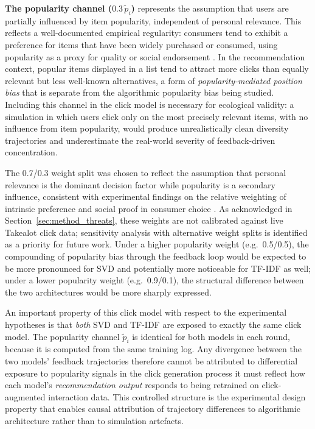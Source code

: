 \documentclass[11pt,a4paper]{report}
\begin{document}
\textbf{The popularity channel ($0.3\, \tilde{p}_i$)} represents the assumption that users are partially influenced by item popularity, independent of personal relevance. This reflects a well-documented empirical regularity: consumers tend to exhibit a preference for items that have been widely purchased or consumed, using popularity as a proxy for quality or social endorsement \citep{cialdini1984influence}. In the recommendation context, popular items displayed in a list tend to attract more clicks than equally relevant but less well-known alternatives, a form of \emph{popularity-mediated position bias} that is separate from the algorithmic popularity bias being studied. Including this channel in the click model is necessary for ecological validity: a simulation in which users click only on the most precisely relevant items, with no influence from item popularity, would produce unrealistically clean diversity trajectories and underestimate the real-world severity of feedback-driven concentration.

The 0.7/0.3 weight split was chosen to reflect the assumption that personal relevance is the dominant decision factor while popularity is a secondary influence, consistent with experimental findings on the relative weighting of intrinsic preference and social proof in consumer choice \citep{cialdini1984influence}. As acknowledged in Section~\ref{sec:method_threats}, these weights are not calibrated against live Takealot click data; sensitivity analysis with alternative weight splits is identified as a priority for future work. Under a higher popularity weight (e.g.\ 0.5/0.5), the compounding of popularity bias through the feedback loop would be expected to be more pronounced for SVD and potentially more noticeable for TF-IDF as well; under a lower popularity weight (e.g.\ 0.9/0.1), the structural difference between the two architectures would be more sharply expressed.

An important property of this click model with respect to the experimental hypotheses is that \emph{both} SVD and TF-IDF are exposed to exactly the same click model. The popularity channel $\tilde{p}_i$ is identical for both models in each round, because it is computed from the same training log. Any divergence between the two models' feedback trajectories therefore cannot be attributed to differential exposure to popularity signals in the click generation process it must reflect how each model's \emph{recommendation output} responds to being retrained on click-augmented interaction data. This controlled structure is the experimental design property that enables causal attribution of trajectory differences to algorithmic architecture rather than to simulation artefacts.
\end{document}
